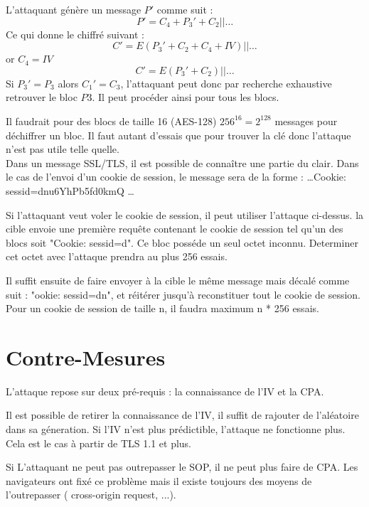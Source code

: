 L'attaquant génère un message $P'$ comme suit :
\[ P' = C_4 + P_3' + C_2 || \dots\]
Ce qui donne le chiffré suivant :
\[ C' = E(P_3' + C_2 + C_4 + IV) || \dots  \]
or $C_4 = IV$
\[ C' = E(P_3' + C_2) || \dots \]
Si $P_3' = P_3 $ alors $C_1' = C_3$, l'attaquant peut donc par recherche exhaustive retrouver le bloc $P3$. Il peut
procéder ainsi pour tous les blocs. 

Il faudrait pour des blocs de taille 16 (AES-128) $256^{16} = 2^{128}$ messages pour déchiffrer un bloc. Il faut autant
d'essais que pour trouver la clé donc l'attaque n'est pas utile telle quelle.\\ 

Dans un message SSL/TLS, il est possible de connaître une partie du clair. Dans le cas de l'envoi d'un cookie de 
session, le message sera de la forme : \dots Cookie: sessid=dnu6YhPb5fd0kmQ \dots

Si l'attaquant veut voler le cookie de session, il peut utiliser l'attaque ci-dessus. la cible envoie une première
requête contenant le cookie de session tel qu'un des blocs soit "Cookie: sessid=d". Ce bloc posséde un seul octet
inconnu. Determiner cet octet avec l'attaque prendra au plus 256 essais.

Il suffit ensuite de faire envoyer à la cible le même message mais décalé comme suit : "ookie: sessid=dn", et
réitérer jusqu'à reconstituer tout le cookie de session. Pour un cookie de session de taille n, il faudra maximum
n * 256 essais.

\section{Contre-Mesures}
\label{sec:cmBeast}

   L'attaque repose sur deux pré-requis : la connaissance de l'IV et la CPA. 

Il est possible de retirer la connaissance de l'IV, il suffit de rajouter de l'aléatoire dans sa géneration. 
Si l'IV n'est plus prédictible, l'attaque ne fonctionne plus. Cela est le cas à partir de TLS 1.1 et plus.

Si L'attaquant ne peut pas outrepasser le SOP, il ne peut plus faire de CPA. Les navigateurs ont fixé ce problème mais
il existe toujours des moyens de l'outrepasser ( cross-origin request, ...). 



